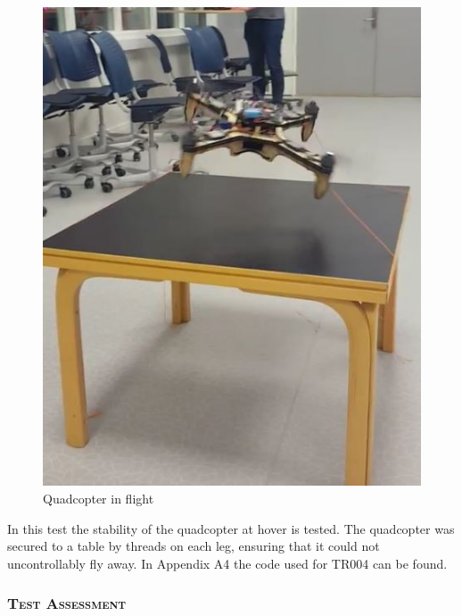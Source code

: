 \begin{figure}[h]
\begin{minipage}[b]{0.45\textwidth}
            \includegraphics[width = 1\textwidth]{VAPIQ-PICTURES/flighttest}
            \caption{Quadcopter in flight}
            \label{fig:ft2}
        \end{minipage}
\end{figure}

\noindent In this test the stability of the quadcopter at hover is tested. The quadcopter was secured to a table by threads on each leg, ensuring that it could not uncontrollably fly away. In Appendix A4 the code used for TR004 can be found. 

\subsubsection*{\textsc{\medium Test Assessment}}

